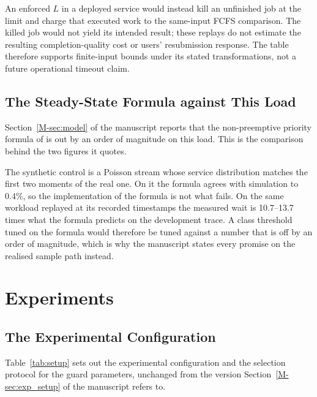 \documentclass[mathematics,supfile,submit,moreauthors]{Definitions/mdpi}
\newcommand{\devnum}[1]{#1}
\begin{document}
An enforced $L$ in a deployed service would instead kill an unfinished job at the
limit and charge that executed work to the same-input FCFS comparison. The killed
job would not yield its intended result; these replays do not estimate the resulting
completion-quality cost or users' resubmission response. The table therefore
supports finite-input bounds under its stated transformations, not a future
operational timeout claim.


\subsection{The Steady-State Formula against This Load}
\label{sec:supp_steady}

Section~\ref*{M-sec:model} of the manuscript reports that the non-preemptive priority formula of
\cite{harcholbalter2013} is out by an order of magnitude on this load. This is the
comparison behind the two figures it quotes.

The synthetic control is a Poisson stream whose service distribution matches the first
two moments of the real one. On it the formula agrees with simulation to
\devnum{0.4\%}, so the implementation of the formula is not what fails. On the same
workload replayed at its recorded timestamps the measured wait is
\devnum{10.7}--\devnum{13.7} times what the formula predicts on the development trace.
A class threshold tuned on the formula would therefore be tuned against a number that
is off by an order of magnitude, which is why the manuscript states every promise on
the realised sample path instead.

\section{Experiments}
\label{sec:supp_exp}

\subsection{The Experimental Configuration}
\label{sec:supp_config}

Table~\ref{tab:setup} sets out the experimental configuration and the selection protocol
for the guard parameters, unchanged from the version Section~\ref*{M-sec:exp_setup} of the manuscript
refers to.
\end{document}
